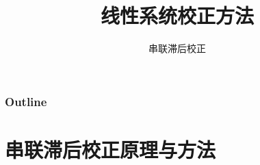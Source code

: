 \documentclass[table]{beamer}
\subtitle{串联滞后校正}
\title{线性系统校正方法}
\author{}
\date{}
\begin{document}
\maketitle

\begin{frame}
\frametitle{Outline}
\setcounter{tocdepth}{3}
\tableofcontents
\end{frame}













\section{串联滞后校正原理与方法}
\label{sec-1}
\end{document}
